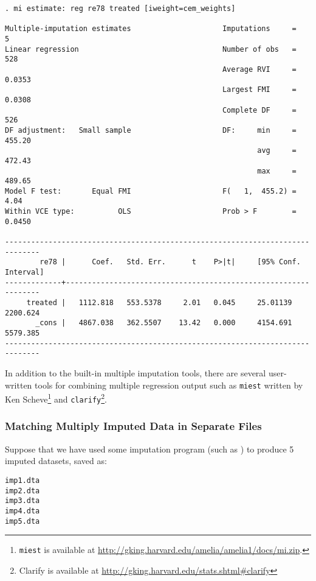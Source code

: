 \documentclass[11pt]{article}
\begin{document}
\begin{verbatim}
. mi estimate: reg re78 treated [iweight=cem_weights]

Multiple-imputation estimates                     Imputations     =          5
Linear regression                                 Number of obs   =        528
                                                  Average RVI     =     0.0353
                                                  Largest FMI     =     0.0308
                                                  Complete DF     =        526
DF adjustment:   Small sample                     DF:     min     =     455.20
                                                          avg     =     472.43
                                                          max     =     489.65
Model F test:       Equal FMI                     F(   1,  455.2) =       4.04
Within VCE type:          OLS                     Prob > F        =     0.0450

------------------------------------------------------------------------------
        re78 |      Coef.   Std. Err.      t    P>|t|     [95% Conf. Interval]
-------------+----------------------------------------------------------------
     treated |   1112.818   553.5378     2.01   0.045     25.01139    2200.624
       _cons |   4867.038   362.5507    13.42   0.000     4154.691    5579.385
------------------------------------------------------------------------------

\end{verbatim}

In addition to the built-in multiple imputation tools, there are
several user-written tools for combining multiple regression output
such as \texttt{miest} written by Ken Scheve\footnote{\texttt{miest}
  is available at
  \url{http://gking.harvard.edu/amelia/amelia1/docs/mi.zip}.} and
\texttt{clarify}\footnote{Clarify is available at
  \url{http://gking.harvard.edu/stats.shtml\#clarify}}.

\subsubsection{Matching Multiply Imputed Data in Separate Files}\label{s:mvmi}

Suppose that we have used some imputation program (such as
\citep{HonKinBLa10}) to produce 5 imputed datasets, saved as:

\begin{verbatim}
imp1.dta
imp2.dta
imp3.dta
imp4.dta
imp5.dta
\end{verbatim}
\end{document}
